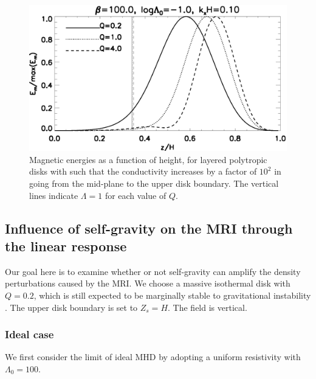 \begin{figure}
  \includegraphics[width=\linewidth]{figures/compare_results_poly_layer_amp100}
  \caption{Magnetic energies as a function of height, for layered polytropic disks with
    such that the conductivity increases by a 
    factor of $10^2$ in going from the mid-plane to the upper disk
    boundary. The vertical lines indicate $\Lambda=1$ for each value
    of $Q$.
    \label{poly_layer}}
\end{figure}


\subsection{Influence of self-gravity on the MRI through the linear
  response}  
 
Our goal here is to examine whether or not self-gravity can amplify
the density perturbations caused by the MRI. We choose a massive 
isothermal disk with $Q=0.2$, which is still expected to be marginally
stable to gravitational instability \citep[][who find
a critical value of  $Q\simeq 0.2$]{mamat10}.  
The upper disk boundary is set to $Z_s=H$. The field is vertical.  


\subsubsection{Ideal case}
We first consider the limit of ideal MHD by adopting a uniform
resistivity with $\Lambda_0=100$. %



